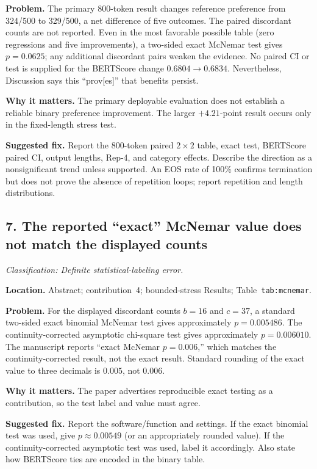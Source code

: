 \documentclass[11pt]{article}
\newcommand{\findinglabel}[1]{\textbf{#1}}
\newcommand{\classification}[1]{\textit{Classification: #1.}}
\begin{document}
\findinglabel{Problem.} The primary 800-token result changes reference preference from 324/500 to 329/500, a net difference of five outcomes.  The paired discordant counts are not reported.  Even in the most favorable possible table (zero regressions and five improvements), a two-sided exact McNemar test gives $p=0.0625$; any additional discordant pairs weaken the evidence.  No paired CI or test is supplied for the BERTScore change $0.6804\rightarrow0.6834$.  Nevertheless, Discussion says this ``prov[es]'' that benefits persist.

\findinglabel{Why it matters.} The primary deployable evaluation does not establish a reliable binary preference improvement.  The larger $+4.21$-point result occurs only in the fixed-length stress test.

\findinglabel{Suggested fix.} Report the 800-token paired $2\times2$ table, exact test, BERTScore paired CI, output lengths, Rep-4, and category effects.  Describe the direction as a nonsignificant trend unless supported.  An EOS rate of 100\% confirms termination but does not prove the absence of repetition loops; report repetition and length distributions.

\subsection*{7. The reported ``exact'' McNemar value does not match the displayed counts}

\classification{Definite statistical-labeling error}

\findinglabel{Location.} Abstract; contribution~4; bounded-stress Results; Table~\texttt{tab:mcnemar}.

\findinglabel{Problem.} For the displayed discordant counts $b=16$ and $c=37$, a standard two-sided exact binomial McNemar test gives approximately $p=0.005486$.  The continuity-corrected asymptotic chi-square test gives approximately $p=0.006010$.  The manuscript reports ``exact McNemar $p=0.006$,'' which matches the continuity-corrected result, not the exact result.  Standard rounding of the exact value to three decimals is $0.005$, not $0.006$.

\findinglabel{Why it matters.} The paper advertises reproducible exact testing as a contribution, so the test label and value must agree.

\findinglabel{Suggested fix.} Report the software/function and settings.  If the exact binomial test was used, give $p\approx0.00549$ (or an appropriately rounded value).  If the continuity-corrected asymptotic test was used, label it accordingly.  Also state how BERTScore ties are encoded in the binary table.
\end{document}
